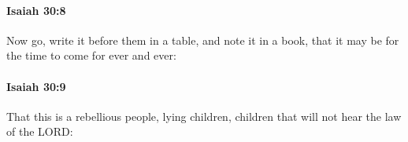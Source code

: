 		\paragraph{Isaiah 30:8} %
			\label{ISAIAH-30-8}

			Now go, write it before them in a table, and note it in a book, that it may be for the time to come for ever and ever:


		\paragraph{Isaiah 30:9} %
			\label{ISAIAH-30-9}

			That this is a rebellious people, lying children, children that will not hear the law of the LORD:


